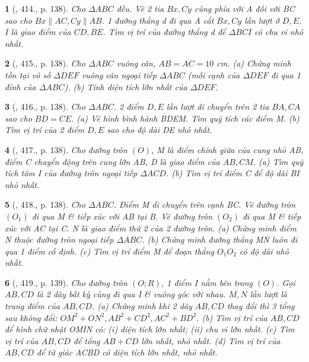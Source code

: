\documentclass{article}
\newtheorem{baitoan}{}
\begin{document}
\begin{baitoan}[\cite{Binh_Toan_9_tap_2}, 414., p. 138]
	Cho $\Delta ABC$ đều. Vẽ 2 tia $Bx,Cy$ cùng phía với A đối với BC sao cho $Bx\parallel AC,Cy\parallel AB$. 1 đường thẳng d đi qua A cắt $Bx,Cy$ lần lượt ở $D,E$. I là giao điểm của $CD,BE$. Tìm vị trí của đường thẳng d để $\Delta BCI$ có chu vi nhỏ nhất.
\end{baitoan}

\begin{baitoan}[\cite{Binh_Toan_9_tap_2}, 415., p. 138]
	Cho $\Delta ABC$ vuông cân, $AB = AC = 10$ {\rm cm}. (a) Chứng minh tồn tại vô số $\Delta DEF$ vuông cân ngoại tiếp $\Delta ABC$ (mỗi cạnh của $\Delta DEF$ đi qua 1 đỉnh của $\Delta ABC$). (b) Tính diện tích lớn nhất của $\Delta DEF$.
\end{baitoan}

\begin{baitoan}[\cite{Binh_Toan_9_tap_2}, 416., p. 138]
	Cho $\Delta ABC$. 2 điểm $D,E$ lần lượt di chuyển trên 2 tia $BA,CA$ sao cho $BD = CE$. (a) Vẽ hình bình hành BDEM. Tìm quỹ tích các điểm M. (b) Tìm vị trí của 2 điểm $D,E$ sao cho độ dài DE nhỏ nhất.
\end{baitoan}

\begin{baitoan}[\cite{Binh_Toan_9_tap_2}, 417., p. 138]
	Cho đường tròn $(O)$, M là điểm chính giữa của cung nhỏ AB, điểm C chuyển động trên cung lớn AB, D là giao điểm của $AB,CM$. (a) Tìm quỹ tích tâm I của đường tròn ngoại tiếp $\Delta ACD$. (b) Tìm vị trí điểm C để độ dài BI nhỏ nhất.
\end{baitoan}

\begin{baitoan}[\cite{Binh_Toan_9_tap_2}, 418., p. 138]
	Cho $\Delta ABC$. Điểm M di chuyển trên cạnh BC. Vẽ đường tròn $(O_1)$ đi qua M \& tiếp xúc với AB tại B. Vẽ đường tròn $(O_2)$ đi qua M \& tiếp xúc với AC tại C. N là giao điểm thứ 2 của 2 đường tròn. (a) Chứng minh điểm N thuộc đường tròn ngoại tiếp $\Delta ABC$. (b) Chứng minh đường thẳng MN luôn đi qua 1 điểm cố định. (c) Tìm vị trí điểm M để đoạn thẳng $O_1O_2$ có độ dài nhỏ nhất.
\end{baitoan}

\begin{baitoan}[\cite{Binh_Toan_9_tap_2}, 419., p. 139]
	Cho đường tròn $(O;R)$, 1 điểm I nằm bên trong $(O)$. Gọi $AB,CD$ là 2 dây bất kỳ cùng đi qua I \& vuông góc với nhau. $M,N$ lần lượt là trung điểm của $AB,CD$. (a) Chứng minh khi 2 dây $AB,CD$ thay đổi thì 3 tổng sau không đổi: $OM^2 + ON^2,AB^2 + CD^2,AC^2 + BD^2$. (b) Tìm vị trí của $AB,CD$ để hình chữ nhật OMIN có: (i) diện tích lớn nhất; (ii) chu vi lớn nhất. (c) Tìm vị trí của $AB,CD$ để tổng $AB + CD$ lớn nhất, nhỏ nhất. (d) Tìm vị trí của $AB,CD$ để tứ giác ACBD có diện tích lớn nhất, nhỏ nhất.
\end{baitoan}
\end{document}
